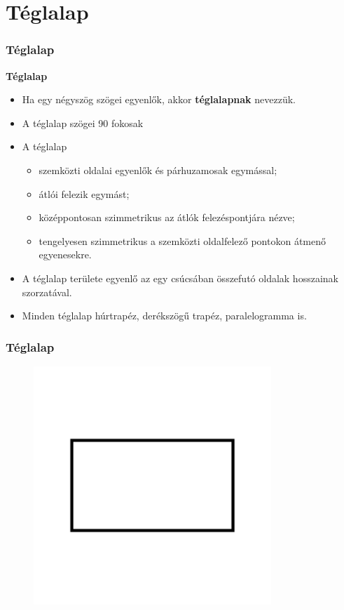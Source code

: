 \documentclass[11pt]{beamer}
\begin{document}
\section{\textbf{Téglalap}}
\begin{frame}[<+->]
\frametitle{Téglalap}
\begin{block}{\textbf{Téglalap}}
\begin{itemize}[label=$\circ$]
\item Ha egy négyszög szögei egyenlők, akkor \textbf{téglalapnak} nevezzük.
\item A téglalap szögei 90 fokosak
\item A téglalap
\begin{itemize}[label=$\cdot$]
\item szemközti oldalai egyenlők és párhuzamosak egymással;
\item átlói felezik egymást;
\item középpontosan szimmetrikus az átlók felezéspontjára nézve;
\item tengelyesen szimmetrikus a szemközti oldalfelező pontokon átmenő egyenesekre.
\end{itemize}
\item A téglalap területe egyenlő az egy csúcsában összefutó oldalak hosszainak szorzatával.
\item Minden téglalap húrtrapéz, derékszögű trapéz, paralelogramma is.
\end{itemize}
\end{block}
\end{frame}

\begin{frame}
\frametitle{Téglalap}
\begin{figure}
  \includegraphics[width=0.8\textwidth]{rectangle.png}
\end{figure}
\end{frame}
\end{document}
